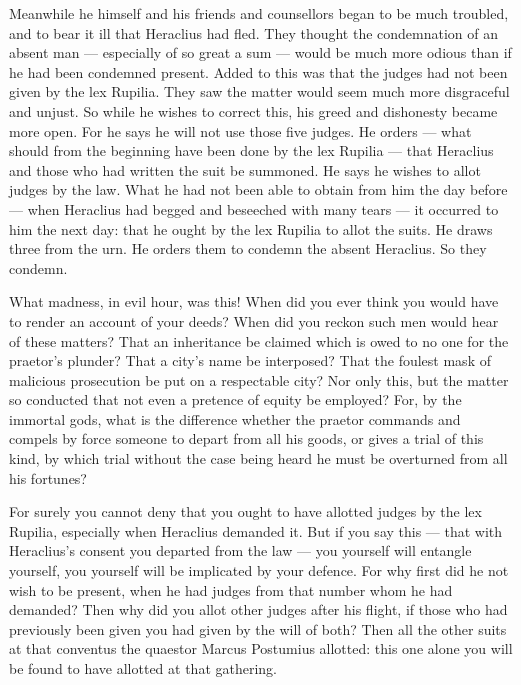  Meanwhile he himself and his friends and counsellors began to be much troubled, and to bear it ill that Heraclius had fled. They thought the condemnation of an absent man --- especially of so great a sum --- would be much more odious than if he had been condemned present. Added to this was that the judges had not been given by the lex Rupilia. They saw the matter would seem much more disgraceful and unjust. So while he wishes to correct this, his greed and dishonesty became more open. For he says he will not use those five judges. He orders --- what should from the beginning have been done by the lex Rupilia --- that Heraclius and those who had written the suit be summoned. He says he wishes to allot judges by the law. What he had not been able to obtain from him the day before --- when Heraclius had begged and beseeched with many tears --- it occurred to him the next day: that he ought by the lex Rupilia to allot the suits. He draws three from the urn. He orders them to condemn the absent Heraclius. So they condemn.

 What madness, in evil hour, was this! When did you ever think you would have to render an account of your deeds? When did you reckon such men would hear of these matters? That an inheritance be claimed which is owed to no one for the praetor's plunder? That a city's name be interposed? That the foulest mask of malicious prosecution be put on a respectable city? Nor only this, but the matter so conducted that not even a pretence of equity be employed? For, by the immortal gods, what is the difference whether the praetor commands and compels by force someone to depart from all his goods, or gives a trial of this kind, by which trial without the case being heard he must be overturned from all his fortunes?

 For surely you cannot deny that you ought to have allotted judges by the lex Rupilia, especially when Heraclius demanded it. But if you say this --- that with Heraclius's consent you departed from the law --- you yourself will entangle yourself, you yourself will be implicated by your defence. For why first did he not wish to be present, when he had judges from that number whom he had demanded? Then why did you allot other judges after his flight, if those who had previously been given you had given by the will of both? Then all the other suits at that conventus the quaestor Marcus Postumius allotted: this one alone you will be found to have allotted at that gathering.

